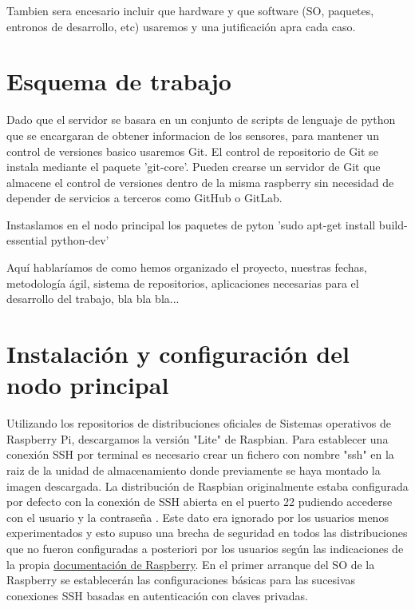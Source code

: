 Tambien sera encesario incluir que hardware y que software (SO, paquetes, entronos de desarrollo, etc) usaremos y una jutificación apra cada caso.


\section{Esquema de trabajo}
\label{makereference1.5}

Dado que el servidor se basara en un conjunto de scripts de lenguaje de python que se encargaran de obtener informacion de los sensores, para mantener un control de versiones basico usaremos Git. El control de repositorio de Git se instala mediante el paquete 'git-core'. Pueden crearse un servidor de Git que almacene el control de versiones dentro de la misma raspberry sin necesidad de depender de servicios a terceros como GitHub o GitLab.

Instaslamos en el nodo principal los paquetes de pyton 'sudo apt-get install build-essential python-dev'



Aquí hablaríamos de como hemos organizado el proyecto, nuestras fechas, metodología ágil, sistema de repositorios, aplicaciones necesarias para el desarrollo del trabajo, bla bla bla...

\section{Instalación y configuración del nodo principal}
\label{makereference1.6}
 Utilizando los repositorios de distribuciones oficiales de Sistemas operativos de Raspberry Pi, descargamos la versión "Lite" de Raspbian. Para establecer una conexión SSH por terminal es necesario crear un fichero con nombre "ssh" en la raiz de la unidad de almacenamiento donde previamente se haya montado la imagen descargada. La distribución de Raspbian originalmente estaba configurada por defecto con la conexión de SSH abierta en el puerto 22 pudiendo accederse con el usuario  y la contraseña . Este dato era ignorado por los usuarios menos experimentados y esto supuso una brecha de seguridad en todos las distribuciones que no fueron configuradas a posteriori por los usuarios según las indicaciones de la propia  \href{https://www.raspberrypi.org/documentation/configuration/security.md}{documentación de Raspberry}. En el primer arranque del SO de la Raspberry se establecerán las configuraciones básicas para las sucesivas conexiones SSH basadas en autenticación con claves privadas.

